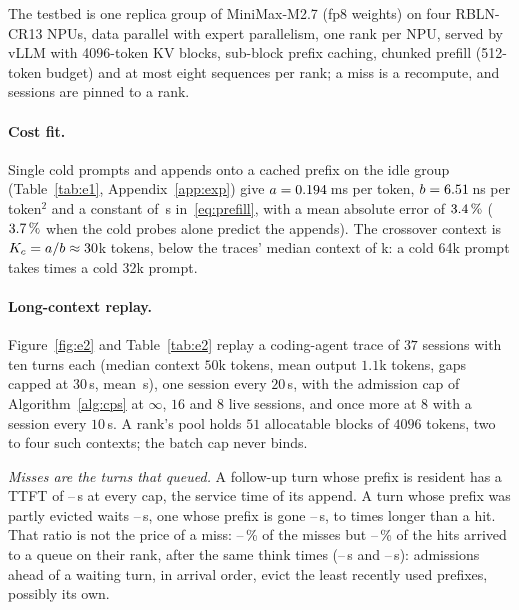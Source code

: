 \documentclass{article}
\theoremstyle{plain}
\theoremstyle{definition}
\theoremstyle{remark}
\begin{document}
The testbed is one replica group of MiniMax-M2.7 (fp8 weights) on four
RBLN-CR13 NPUs, data parallel with expert parallelism, one rank per
NPU, served by vLLM with 4096-token KV blocks, sub-block prefix
caching, chunked prefill (512-token budget) and at most eight
sequences per rank; a miss is a recompute, and sessions are pinned to
a rank.

\paragraph{Cost fit.} Single cold prompts and appends onto a
cached prefix on the idle group (Table~\ref{tab:e1},
Appendix~\ref{app:exp}) give $a=0.194$\,ms per token,
$b=6.51$\,ns per token$^2$ and a constant of \eOneCzero\,s
in~\eqref{eq:prefill}, with a mean absolute error of $3.4\,\%$
($3.7\,\%$ when the cold probes alone predict the
appends). The crossover context is $K_c=a/b\approx30$k tokens,
below the traces' median context of \wkContextMedian k: a cold 64k
prompt takes \eOneRatioSixtyFour{} times a cold 32k prompt.

\paragraph{Long-context replay.} Figure~\ref{fig:e2} and
Table~\ref{tab:e2} replay a coding-agent trace of $37$ sessions with
ten turns each (median context $50$k tokens, mean output $1.1$k tokens,
gaps capped at $30$\,s, mean \eTwoThink\,s), one session every
$20$\,s, with the admission cap of Algorithm~\ref{alg:cps} at
$\infty$, $16$ and $8$ live sessions, and once more at $8$ with a
session every $10$\,s. A rank's pool holds $51$ allocatable blocks of
$4096$ tokens, two to four such contexts; the batch cap never binds.

\emph{Misses are the turns that queued.} A follow-up turn whose prefix
is resident has a TTFT of \eTwoHitTtftLo--\eTwoHitTtftHi\,s at every
cap, the service time of its append. A turn whose prefix was partly
evicted waits \eTwoPartialTtftLo--\eTwoPartialTtftHi\,s, one whose
prefix is gone \eTwoMissTtftLo--\eTwoMissTtftHi\,s, \eTwoMissOverHitLo{}
to \eTwoMissOverHitHi{} times longer than a hit. That ratio is not the
price of a miss: \eTwoMissQueueLo--\eTwoMissQueueHi\,\% of the misses
but \eTwoHitQueueLo--\eTwoHitQueueHi\,\% of the hits arrived to a queue
on their rank, after the same think times
(\eTwoMissThinkLo--\eTwoMissThinkHi\,s and
\eTwoHitThinkLo--\eTwoHitThinkHi\,s): admissions ahead of a waiting
turn, in arrival order, evict the least recently used prefixes,
possibly its own.
\end{document}
